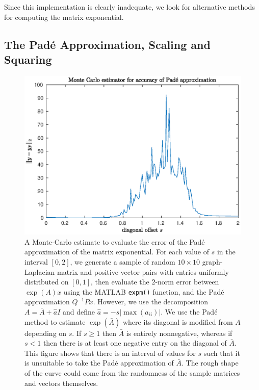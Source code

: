 
Since this implementation is clearly inadequate, we look for alternative methods for computing the matrix exponential.

\subsection{The Pad\'e Approximation, Scaling and Squaring}

\begin{figure}
    \centering
    \includegraphics[width=\linewidth]{Matlab/padeapproximator.eps}
    \caption{
        A Monte-Carlo estimate to evaluate the error of the Pad\'e approximation of the matrix exponential.
        For each value of $s$ in the interval $[0,2]$, we generate a sample of random $10\times 10$ graph-Laplacian matrix and positive vector pairs with entries uniformly distributed on $[0,1]$,
        then evaluate the $2$-norm error between $\exp(A)x$ using the MATLAB \texttt{expm()} function, and the Pad\'e approximation $Q^{-1}Px$.
        However, we use the decomposition $A = \bar{A} + \hat{a}I$ and define $\hat{a}= -s |\max(a_{ii})|$.
        We use the Pad\'e method to estimate $\exp(\bar{A})$ where its diagonal is modified from $A$ depending on $s$.
        If $s \ge 1$ then $\bar{A}$ is entirely nonnegative, whereas if $s<1$ then there is at least one negative entry on the diagonal of $\bar{A}$.
        This figure shows that there is an interval of values for $s$ such that it is unsuitable to take the Pad\'e approximation of $\bar{A}$. 
        The rough shape of the curve could come from the randomness of the sample matrices and vectors themselves.
    }
    \label{fig:mcpade}
\end{figure}


